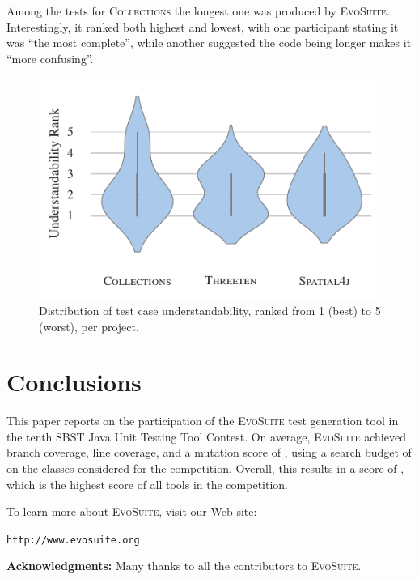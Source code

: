 \documentclass[10pt,conference]{IEEEtran}
\newcommand{\project}[1]{\textsc{#1}\xspace}
\newcommand{\Collections}{\project{Collections}}
\newcommand{\EVOSUITE}{\textsc{EvoSuite}\xspace}
\begin{document}
Among the tests for \Collections the longest one was produced by \EVOSUITE.
Interestingly, it ranked both highest and lowest, with one participant
stating it was ``the most complete'', while another suggested the code
being longer makes it ``more confusing''.


\begin{figure}
  \includegraphics[width=\columnwidth]{./data/understandability}
  \caption{Distribution of test case understandability, ranked from 1 (best) to 5 (worst), per project.}
  \label{fig:readability}
\end{figure}


\section{Conclusions}

This paper reports on the participation of the \EVOSUITE test generation tool
in the tenth SBST Java Unit Testing Tool Contest. On average, \EVOSUITE
achieved \avgConditionsCoverageRatioLong branch coverage,
\avgLinesCoverageRatioLong line coverage, and a mutation score of
\avgMutantsCoverageRatioLong, using a search budget of \budgetLong on the \cuts
classes considered for the competition. Overall, this results in a score of
\score, which is the highest score of all tools in the competition.


To learn more about \EVOSUITE, visit our Web site:
\begin{center}
\texttt{http://www.evosuite.org}
\end{center}



\textbf{Acknowledgments:} Many thanks to all the contributors to
\EVOSUITE.




\balance
\end{document}
